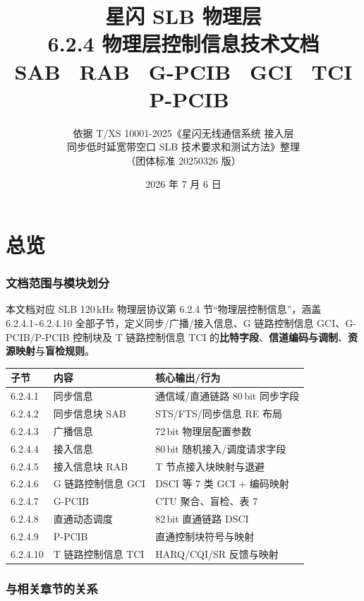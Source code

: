 \documentclass[11pt,a4paper]{ctexart}
\title{%
  \textbf{星闪 SLB 物理层}\\[0.4em]
  \Large 6.2.4 物理层控制信息技术文档\\[0.3em]
  \large SAB \textbullet\ RAB \textbullet\ G-PCIB \textbullet\ GCI \textbullet\ TCI \textbullet\ P-PCIB
}
\author{依据 T/XS 10001-2025《星闪无线通信系统 接入层\\
同步低时延宽带空口 SLB 技术要求和测试方法》整理\\
（团体标准 20250326 版）}
\date{2026 年 7 月 6 日}
\begin{document}
\maketitle
\tableofcontents
\newpage

\part{总览}

\section{文档范围与模块划分}

本文档对应 SLB 120\,kHz 物理层协议第 6.2.4 节``物理层控制信息''，涵盖 6.2.4.1\textasciitilde 6.2.4.10 全部子节，定义同步/广播/接入信息、G 链路控制信息 GCI、G-PCIB/P-PCIB 控制块及 T 链路控制信息 TCI 的\textbf{比特字段}、\textbf{信道编码与调制}、\textbf{资源映射}与\textbf{盲检规则}。

\begin{table}[h]
\centering
\small
\begin{tabular}{L{2.2cm}L{4.2cm}L{6.1cm}}
\toprule
\textbf{子节} & \textbf{内容} & \textbf{核心输出/行为} \\
.4.1 & 同步信息 & 通信域/直通链路 80\,bit 同步字段 \\
6.2.4.2 & 同步信息块 SAB & STS/FTS/同步信息 RE 布局 \\
6.2.4.3 & 广播信息 & 72\,bit 物理层配置参数 \\
6.2.4.4 & 接入信息 & 80\,bit 随机接入/调度请求字段 \\
6.2.4.5 & 接入信息块 RAB & T 节点接入块映射与退避 \\
6.2.4.6 & G 链路控制信息 GCI & DSCI 等 7 类 GCI + 编码映射 \\
6.2.4.7 & G-PCIB & CTU 聚合、盲检、表 7 \\
6.2.4.8 & 直通动态调度 & 82\,bit 直通链路 DSCI \\
6.2.4.9 & P-PCIB & 直通控制块符号与映射 \\
6.2.4.10 & T 链路控制信息 TCI & HARQ/CQI/SR 反馈与映射 \\
\bottomrule
\end{tabular}
\end{table}

\section{与相关章节的关系}
\end{document}
